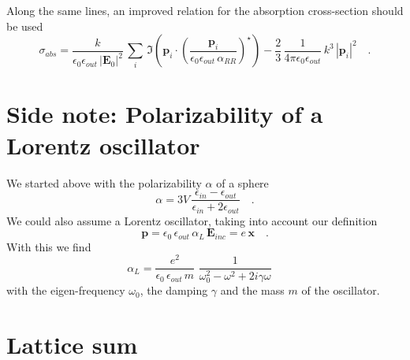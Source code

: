 Along the same lines, an improved relation for the absorption cross-section should be used
 \begin{equation}
\sigma_{abs} = \frac{k}{\epsilon_0 \epsilon_{out}  \, |\mathbf{E}_{0}|^2} \, \sum_i \, \Im \left( \mathbf{p}_i \cdot \left( \frac{\mathbf{p}_i}{\epsilon_0 \epsilon_{out}  \, \alpha_{RR}} \right) ^\star \right) 
- \frac{2}{3} \, \frac{1}{4 \pi \epsilon_0 \epsilon_{out}} \,  k^3 \, |  \mathbf{p}_i |^2 \quad .
\end{equation}


\section{Side note: Polarizability of  a Lorentz oscillator}

We started above with the polarizability $\alpha$ of a sphere
\begin{equation}
 \alpha = 3V \, \frac{\epsilon_{in} - \epsilon_{out}}{\epsilon_{in} + 2 \epsilon_{out}} \quad .
\end{equation}
We could also assume a Lorentz oscillator, taking into account our definition 
 \begin{equation}
\mathbf{p} = \epsilon_0 \, \epsilon_{out} \, \alpha_L \, \mathbf{E}_{inc} = e \, \mathbf{x} \quad .
\end{equation}
With this we find 
 \begin{equation}
 \alpha_L = \frac{e^2 }{ \epsilon_0 \, \epsilon_{out}  \, m} \,  \, \frac{1}{\omega_0^2 - \omega^2 +2  i \gamma \omega }  \quad 
\end{equation}
with the eigen-frequency $\omega_0$, the damping $\gamma$ and the mass $m$ of the oscillator.

\section{Lattice sum}

